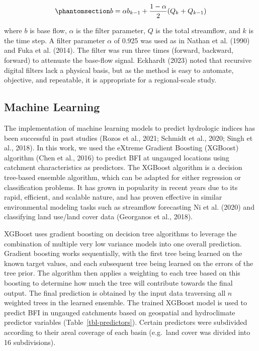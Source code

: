 \documentclass[
]{agujournal2019}
\begin{document}
\begin{equation}\phantomsection\label{eq-bf-separate}{
b = \alpha b_{k-1} + \frac{1-\alpha}{2}(Q_k + Q_{k-1})
}\end{equation}

where \(b\) is base flow, \(\alpha\) is the filter parameter, \(Q\) is
the total streamflow, and \(k\) is the time step. A filter parameter
\(\alpha\) of 0.925 was used as in Nathan et al. (1990) and Fuka et al.
(2014). The filter was run three times (forward, backward, forward) to
attenuate the base-flow signal. Eckhardt (2023) noted that recursive
digital filters lack a physical basis, but as the method is easy to
automate, objective, and repeatable, it is appropriate for a
regional-scale study.

\subsection{Machine Learning}\label{machine-learning}

The implementation of machine learning models to predict hydrologic
indices has been successful in past studies (Rozos et al., 2021; Schmidt
et al., 2020; Singh et al., 2018). In this work, we used the eXtreme
Gradient Boosting (XGBoost) algorithm (Chen et al., 2016) to predict BFI
at ungauged locations using catchment characteristics as predictors. The
XGBoost algorithm is a decision tree-based ensemble algorithm, which can
be adapted for either regression or classification problems. It has
grown in popularity in recent years due to its rapid, efficient, and
scalable nature, and has proven effective in similar environmental
modeling tasks such as streamflow forecasting Ni et al. (2020) and
classifying land use/land cover data (Georganos et al., 2018).

XGBoost uses gradient boosting on decision tree algorithms to leverage
the combination of multiple very low variance models into one overall
prediction. Gradient boosting works sequentially, with the first tree
being learned on the known target values, and each subsequent tree being
learned on the errors of the tree prior. The algorithm then applies a
weighting to each tree based on this boosting to determine how much the
tree will contribute towards the final output. The final prediction is
obtained by the input data traversing all \(n\) weighted trees in the
learned ensemble. The trained XGBoost model is used to predict BFI in
ungauged catchments based on geospatial and hydroclimate predictor
variables (Table~\ref{tbl-predictors}). Certain predictors were
subdivided according to their areal coverage of each basin (e.g.~land
cover was divided into 16 subdivisions).
\end{document}

